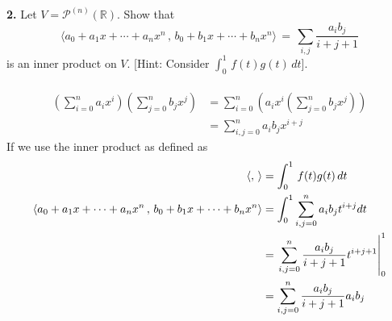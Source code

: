 \documentclass[11pt]{amsart}
\theoremstyle{definition}  %
\newcommand{\R}{\mathbb{R}}
\begin{document}
\newpage
\vskip 0.1cm
\noindent
{\bf 2.}  Let $V = \mathcal{P}^{(n)}(\R)$. Show that
$$ \langle a_0 + a_1x+ \cdots + a_nx^n \, , \, b_0 + b_1x + \cdots + b_n x^n \rangle  \, = \, \sum_{i,j} \frac{a_ib_j}{i+j+1}$$
is an inner product on $V$. [Hint: Consider $\int_0^1  \, f(t) g(t) \, dt$]. \\
\\
\begin{align*}
	\left( \sum_{i=0}^n a_ix^i \right) \left(\sum_{j=0}^n b_jx^j \right) &= \sum_{i=0}^n \left ( a_ix^i\left(\sum_{j=0}^n b_jx^j \right) \right)\\
	&= \sum_{i,j=0}^n a_ib_jx^{i+j}
\end{align*}If we use the inner product as defined as 
\begin{align*}
	\left\langle , \,\right\rangle &= \int_0^1  \, f(t) g(t) \, dt\\
	\langle a_0 + a_1x+ \cdots + a_nx^n \, , \, b_0 + b_1x + \cdots + b_n x^n \rangle &= \int_0^1 \sum_{i,j=0}^n a_ib_jt^{i+j} dt \\
	&= \left . \sum_{i,j=0}^n \frac{a_ib_j}{i+j+1}t^{i+j+1} \right |_0^1\\
	&= \sum_{i,j=0}^n \frac{a_ib_j}{i+j+1}a_ib_j
\end{align*}
\\
\end{document}
